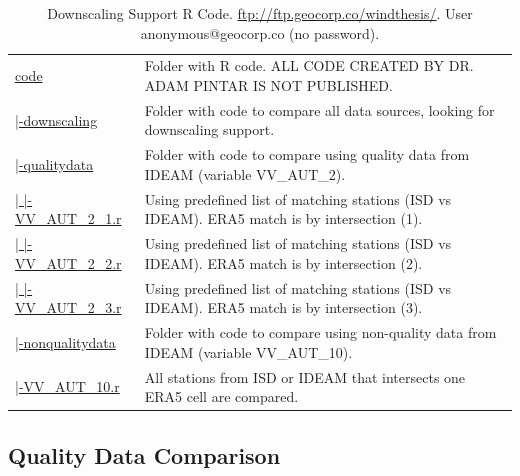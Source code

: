 \documentclass[12pt,oneside]{reedthesis}
\begin{document}
\begingroup\fontsize{7}{9}\selectfont
\begin{longtable}[t]{>{\raggedright\arraybackslash}p{1.3in}>{\raggedright\arraybackslash}p{4.9in}}
\caption[Downscaling Support R Code]{\label{tab:codeds}Downscaling Support R Code. \href{ftp://ftp.geocorp.co/windthesis/}{ftp://ftp.geocorp.co/windthesis/}. User anonymous@geocorp.co (no password).}\\
\toprule
\multicolumn{1}{l}{Folder Tree - Ftp Links} & \multicolumn{1}{l}{Description}\\
\midrule
\href{ftp://ftp.geocorp.co/windthesis/code/}{code} & Folder with R code. ALL CODE CREATED BY DR. ADAM PINTAR IS NOT PUBLISHED.\\
\href{ftp://ftp.geocorp.co/windthesis/code/downscaling/}{\;\;|-downscaling} & Folder with code to compare all data sources, looking for downscaling support.\\
\href{ftp://ftp.geocorp.co/windthesis/code/downscaling/qualitydata/}{\;\;\;\;|-qualitydata} & Folder with code to compare using quality data from IDEAM (variable VV\_AUT\_2).\\
\href{ftp://ftp.geocorp.co/windthesis/code/downscaling/qualitydata/comparing_VV_AUT_2_1.r}{\;\;\;\;|    |-VV\_AUT\_2\_1.r} & Using predefined list of matching stations (ISD vs IDEAM). ERA5 match is by intersection (1).\\
\href{ftp://ftp.geocorp.co/windthesis/code/downscaling/qualitydata/comparing_VV_AUT_2_2.r}{\;\;\;\;|    |-VV\_AUT\_2\_2.r} & Using predefined list of matching stations (ISD vs IDEAM). ERA5 match is by intersection (2).\\
\href{ftp://ftp.geocorp.co/windthesis/code/downscaling/qualitydata/comparing_VV_AUT_2_3.r}{\;\;\;\;|    |-VV\_AUT\_2\_3.r} & Using predefined list of matching stations (ISD vs IDEAM). ERA5 match is by intersection (3).\\
\href{ftp://ftp.geocorp.co/windthesis/code/downscaling/nonqualitydata/}{\;\;\;\;|-nonqualitydata} & Folder with code to compare using non-quality data from IDEAM (variable VV\_AUT\_10).\\
\href{ftp://ftp.geocorp.co/windthesis/code/downscaling/nonqualitydata/comparing_VV_AUT_10.r}{\;\;\;\;\;\;|-VV\_AUT\_10.r} & All stations from ISD or IDEAM that intersects one ERA5 cell are compared.\\
\bottomrule
\end{longtable}
\endgroup{}

\hypertarget{quality-data-comparison}{%
\subsection{Quality Data Comparison}\label{quality-data-comparison}}
\end{document}
